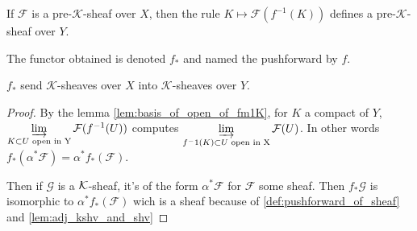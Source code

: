 \begin{definition}\label{def:pushforward_of_K-sheaf}
    If $\mathcal{F}$ is a pre-$\mathcal{K}$-sheaf over $X$, then the rule $K\mapsto \mathcal{F}(f^{-1}(K))$ defines a pre-$\mathcal{K}$-sheaf over $Y$.

    The functor obtained is denoted $f_*$ and named the pushforward by $f$.

    $f_*$ send $\mathcal{K}$-sheaves over $X$ into $\mathcal{K}$-sheaves over $Y$.
\end{definition}

\begin{proof}
    By the lemma \ref{lem:basis_of_open_of_fm1K}, for $K$ a compact of $Y$, $\varinjlim\limits_{K\subset U \text{ open in Y}}\mathcal{F}(f^{-1}(U))$ computes $\varinjlim\limits_{f^-1(K)\subset U \text{ open in X}}\mathcal{F}(U)$. In other words $f_*(\alpha^*\mathcal{F})=\alpha^*f_*(\mathcal{F})$. 

    Then if $\mathcal{G}$ is a $\mathcal{K}$-sheaf, it's of the form $\alpha^*\mathcal{F}$ for $\mathcal{F}$ some sheaf. Then $f_*\mathcal{G}$ is isomorphic to $\alpha^*f_*(\mathcal{F})$ wich is a sheaf because of \ref{def:pushforward_of_sheaf} and \ref{lem:adj_kshv_and_shv}
\end{proof}




